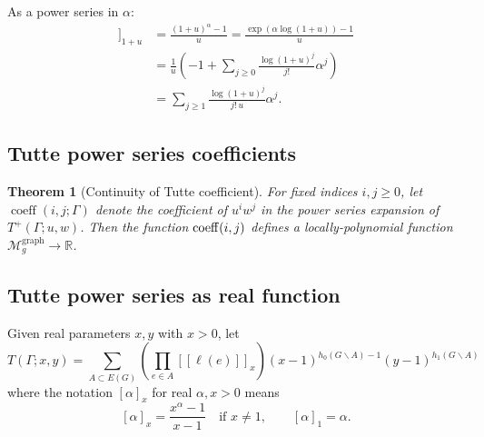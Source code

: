 \documentclass{amsart}
\newtheorem{thm}{Theorem}
\theoremstyle{definition}
\newcommand{\RR}{\mathbb{R}}
\DeclareMathOperator{\coeff}{coeff}
\newcommand{\fanalog}[2]{[\![#2]\!]_{#1}}
\newcommand{\analog}[2]{[#2]_{#1}}
\newcommand{\Mgraphg}{\mathcal M_g^{\mathrm{graph}}}
\begin{document}
As a power series in $\alpha$:
\begin{align*}
\fanalog{1 + u}{\alpha} &= \frac{(1+u)^\alpha - 1}{u}
= \frac{\exp(\alpha \log(1+u)) - 1}{u} \\
&= \frac1{u} \left( -1 + \sum_{j\geq 0} \frac{\log(1+u)^j}{j!} \alpha^j\right) \\
&= \sum_{j\geq 1} \frac{\log(1+u)^j}{j! \, u} \alpha^j .
\end{align*}


\subsection{Tutte power series coefficients}
\begin{thm}[Continuity of Tutte coefficient]
For fixed indices $i,j\geq 0$,
let $\coeff(i,j; \Gamma)$
denote the coefficient of $u^i w^j$ in the power series expansion of $T^+(\Gamma; u,w)$.
Then the function ${\rm coeff}(i,j)$
defines a locally-polynomial 
function $\Mgraphg \to \RR$.
\end{thm}

\subsection{Tutte power series as real function}
Given real parameters $x,y$ with $x > 0$,
let 
\begin{equation}
\label{eq:tutte-metric-graph}
	T(\Gamma; x,y) = \sum_{A \subset E(G)} \left( \prod_{e \in A} \fanalog{x}{\ell(e)} \right)
	(x-1)^{h_0(G\backslash A) - 1}(y-1)^{h_1(G\backslash A)}
\end{equation}
where the notation $\analog{x}{\alpha}$ for real $\alpha, x > 0$ means
\begin{equation*}
\label{eq:q-analog-real}
	\analog{x}{\alpha} = \frac{x^\alpha - 1}{x-1}
	\quad\text{if } x \neq 1,
	\qquad 
	\analog{1}{\alpha} = \alpha.
\end{equation*}

\end{document}
